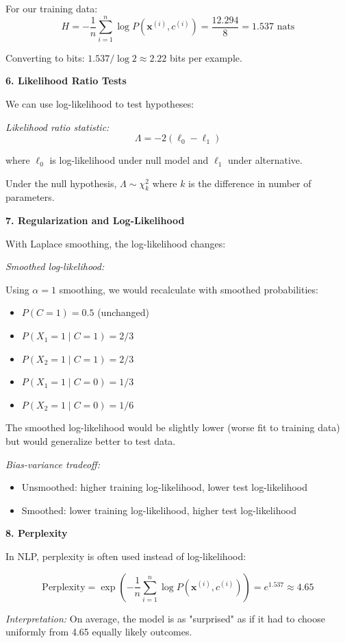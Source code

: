 \documentclass[12pt]{article}
\begin{document}
\begin{explanation}
For our training data:
\[
H = -\frac{1}{n} \sum_{i=1}^{n} \log P(\mathbf{x}^{(i)}, c^{(i)}) = \frac{12.294}{8} = 1.537 \text{ nats}
\]

Converting to bits: $1.537 / \log 2 \approx 2.22$ bits per example.

\textbf{6. Likelihood Ratio Tests}

We can use log-likelihood to test hypotheses:

\textit{Likelihood ratio statistic:}
\[
\Lambda = -2(\ell_0 - \ell_1)
\]

where $\ell_0$ is log-likelihood under null model and $\ell_1$ under alternative.

Under the null hypothesis, $\Lambda \sim \chi^2_k$ where $k$ is the difference in number of parameters.

\textbf{7. Regularization and Log-Likelihood}

With Laplace smoothing, the log-likelihood changes:

\textit{Smoothed log-likelihood:}

Using $\alpha = 1$ smoothing, we would recalculate with smoothed probabilities:
\begin{itemize}
    \item $P(C=1) = 0.5$ (unchanged)
    \item $P(X_1=1 \mid C=1) = 2/3$
    \item $P(X_2=1 \mid C=1) = 2/3$
    \item $P(X_1=1 \mid C=0) = 1/3$
    \item $P(X_2=1 \mid C=0) = 1/6$
\end{itemize}

The smoothed log-likelihood would be slightly lower (worse fit to training data) but would generalize better to test data.

\textit{Bias-variance tradeoff:}
\begin{itemize}
    \item Unsmoothed: higher training log-likelihood, lower test log-likelihood
    \item Smoothed: lower training log-likelihood, higher test log-likelihood
\end{itemize}

\textbf{8. Perplexity}

In NLP, perplexity is often used instead of log-likelihood:

\[
\text{Perplexity} = \exp\left(-\frac{1}{n} \sum_{i=1}^{n} \log P(\mathbf{x}^{(i)}, c^{(i)})\right) = e^{1.537} \approx 4.65
\]

\textit{Interpretation:} On average, the model is as "surprised" as if it had to choose uniformly from 4.65 equally likely outcomes.
\end{explanation}
\end{document}
